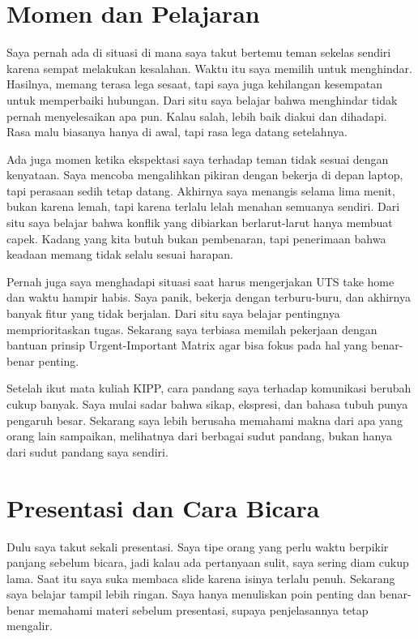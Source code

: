 \documentclass[
  letterpaper,
  DIV=11,
  numbers=noendperiod]{scrreprt}
\begin{document}
\section{Momen dan Pelajaran}\label{momen-dan-pelajaran}

Saya pernah ada di situasi di mana saya takut bertemu teman sekelas
sendiri karena sempat melakukan kesalahan. Waktu itu saya memilih untuk
menghindar. Hasilnya, memang terasa lega sesaat, tapi saya juga
kehilangan kesempatan untuk memperbaiki hubungan. Dari situ saya belajar
bahwa menghindar tidak pernah menyelesaikan apa pun. Kalau salah, lebih
baik diakui dan dihadapi. Rasa malu biasanya hanya di awal, tapi rasa
lega datang setelahnya.

Ada juga momen ketika ekspektasi saya terhadap teman tidak sesuai dengan
kenyataan. Saya mencoba mengalihkan pikiran dengan bekerja di depan
laptop, tapi perasaan sedih tetap datang. Akhirnya saya menangis selama
lima menit, bukan karena lemah, tapi karena terlalu lelah menahan
semuanya sendiri. Dari situ saya belajar bahwa konflik yang dibiarkan
berlarut-larut hanya membuat capek. Kadang yang kita butuh bukan
pembenaran, tapi penerimaan bahwa keadaan memang tidak selalu sesuai
harapan.

Pernah juga saya menghadapi situasi saat harus mengerjakan UTS take home
dan waktu hampir habis. Saya panik, bekerja dengan terburu-buru, dan
akhirnya banyak fitur yang tidak berjalan. Dari situ saya belajar
pentingnya memprioritaskan tugas. Sekarang saya terbiasa memilah
pekerjaan dengan bantuan prinsip Urgent-Important Matrix agar bisa fokus
pada hal yang benar-benar penting.

Setelah ikut mata kuliah KIPP, cara pandang saya terhadap komunikasi
berubah cukup banyak. Saya mulai sadar bahwa sikap, ekspresi, dan bahasa
tubuh punya pengaruh besar. Sekarang saya lebih berusaha memahami makna
dari apa yang orang lain sampaikan, melihatnya dari berbagai sudut
pandang, bukan hanya dari sudut pandang saya sendiri.

\section{Presentasi dan Cara Bicara}\label{presentasi-dan-cara-bicara}

Dulu saya takut sekali presentasi. Saya tipe orang yang perlu waktu
berpikir panjang sebelum bicara, jadi kalau ada pertanyaan sulit, saya
sering diam cukup lama. Saat itu saya suka membaca slide karena isinya
terlalu penuh. Sekarang saya belajar tampil lebih ringan. Saya hanya
menuliskan poin penting dan benar-benar memahami materi sebelum
presentasi, supaya penjelasannya tetap mengalir.
\end{document}
